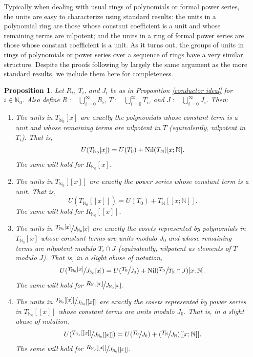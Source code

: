 \documentclass[12pt]{amsart}
\newtheorem{proposition}[theorem]{Proposition}
\theoremstyle{definition}
\newcommand{\bN}{\mathbb N}
\newcommand{\bNo}{{{\mathbb N}_0}}
\newcommand{\quot}[2]{\large\sfrac{#1}{#2}\normalsize}
\newcommand{\Nil}{\textup{Nil}}
\begin{document}
Typically when dealing with usual rings of polynomials or formal power series, the units are easy to characterize using standard results: the units in a polynomial ring are those whose constant coefficient is a unit and whose remaining terms are nilpotent; and the units in a ring of formal power series are those whose constant coefficient is a unit. As it turns out, the groups of units in rings of polynomials or power series over a sequence of rings have a very similar structure. Despite the proofs following by largely the same argument as the more standard results, we include them here for completeness.

\begin{proposition}
    \label{unit construction}
    Let $R_i$, $T_i$, and $J_i$ be as in Proposition \ref{conductor ideal} for $i\in\bN_0$. Also define $R:=\bigcup_{i=0}^\infty R_i$, $T:=\bigcup_{i=0}^\infty T_i$, and $J:=\bigcup_{i=0}^\infty J_i$. Then:
    \begin{enumerate}
        \item The units in $T_{\bNo}[x]$ are exactly the polynomials whose constant term is a unit and whose remaining terms are nilpotent in $T$ (equivalently, nilpotent in $T_i$). That is,
        $$U(T_{\bNo}[x])=U(T_0)+\Nil(T_{\bN})[x;\bN].$$
        The same will hold for $R_{\bNo}[x]$.
        \item The units in $T_{\bNo}[[x]]$ are exactly the power series whose constant term is a unit. That is,
        $$U(T_{\bNo}[[x]])=U(T_0)+T_{\bN}[[x;\bN]].$$
        The same will hold for $R_{\bNo}[[x]]$.
        \item The units in $\quot{
        T_{\bNo}[x]}{J_{\bNo}[x]}$ are exactly the cosets represented by polynomials in $T_{\bNo}[x]$ whose constant terms are units modulo $J_0$ and whose remaining terms are nilpotent modulo $T_i\cap J$ (equivalently, nilpotent as elements of $T$ modulo $J$). That is, in a slight abuse of notation,
        $$U(\quot{
        T_{\bNo}[x]}{J_{\bNo}[x]})=U(\quot{T_0}{J_0})+\Nil(\quot{T_\bN}{T_{\bN}\cap J})[x;\bN].$$
        The same will hold for $\quot{R_{\bNo}[x]}{J_{\bNo}[x]}$.
        \item The units in $\quot{
        T_{\bNo}[[x]]}{J_{\bNo}[[x]]}$ are exactly the cosets represented by power series in $T_{\bNo}[[x]]$ whose constant terms are units modulo $J_0$. That is, in a slight abuse of notation,
        $$U(\quot{
        T_{\bNo}[[x]]}{J_{\bNo}[[x]]})=U(\quot{T_0}{J_0})+(\quot{T_{\bN}}{J_{\bN}})[[x;\bN]].$$
        The same will hold for $\quot{R_{\bNo}[[x]]}{J_{\bNo}[[x]]}$.
    \end{enumerate}
\end{proposition}
\end{document}

